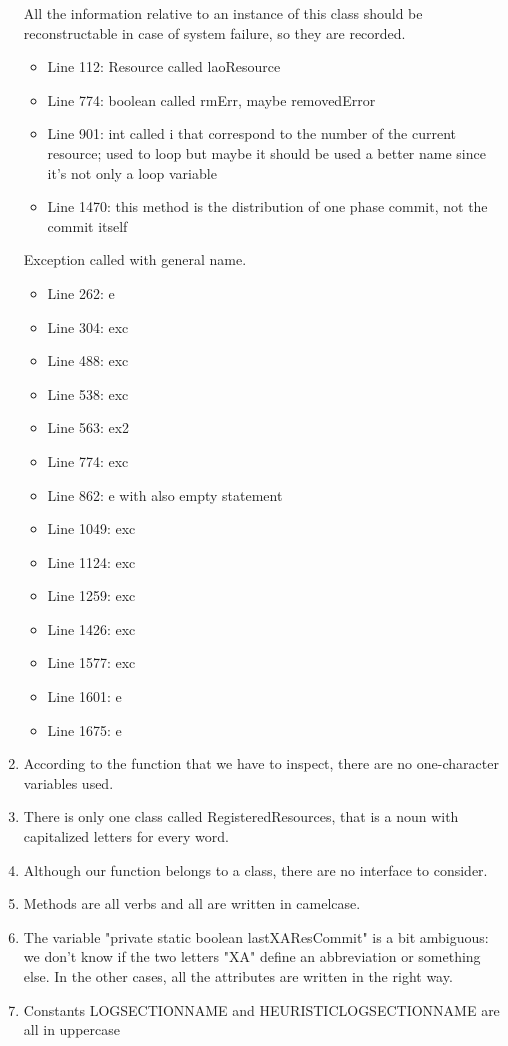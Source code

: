 \begin{enumerate}
	All the information relative to an instance of this class should be reconstructable in case of system failure, so they are recorded.
	\begin{itemize}
		\item Line 112: Resource called laoResource
		\item Line 774: boolean called rmErr, maybe removedError
		\item Line 901: int called i that correspond to the number of the current resource; used to loop but maybe it should be used a better name since it's not only a loop variable
		\item Line 1470: this method is the distribution of one phase commit, not the commit itself
	\end{itemize}
	Exception called with general name.
	\begin{itemize}
		\item Line 262: e
		\item Line 304: exc
		\item Line 488: exc
		\item Line 538: exc
		\item Line 563: ex2
		\item Line 774: exc
		\item Line 862: e with also empty statement
		\item Line 1049: exc
		\item Line 1124: exc
		\item Line 1259: exc
		\item Line 1426: exc
		\item Line 1577: exc
		\item Line 1601: e
		\item Line 1675: e
	\end{itemize}
	\item According to the function that we have to inspect, there are no one-character variables used.
	\item There is only one class called RegisteredResources, that is a noun with capitalized letters for every word.
	\item Although our function belongs to a class, there are no interface to consider.
	\item Methods are all verbs and all are written in camelcase.
	\item The variable "private static boolean lastXAResCommit" is a bit ambiguous: we don't know if the two letters "XA" define an abbreviation or something else. In the other cases, all the attributes are written in the right way.
	\item Constants LOG\textunderscore SECTION\textunderscore NAME and HEURISTIC\textunderscore LOG\textunderscore SECTION\textunderscore NAME are all in uppercase
\end{enumerate}
